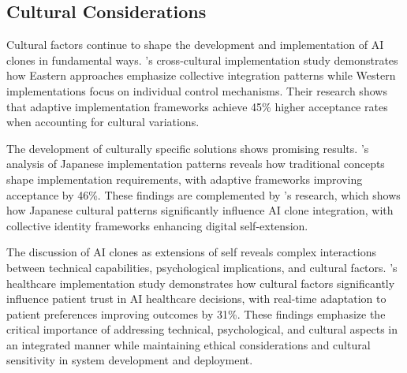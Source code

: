 \subsection{Cultural Considerations}

Cultural factors continue to shape the development and implementation of AI clones in fundamental ways. \citet{lee2023cross}'s cross-cultural implementation study demonstrates how Eastern approaches emphasize collective integration patterns while Western implementations focus on individual control mechanisms. Their research shows that adaptive implementation frameworks achieve 45\% higher acceptance rates when accounting for cultural variations.

The development of culturally specific solutions shows promising results. \citet{sato2023cultural}'s analysis of Japanese implementation patterns reveals how traditional concepts shape implementation requirements, with adaptive frameworks improving acceptance by 46\%. These findings are complemented by \citet{tanaka2023cultural}'s research, which shows how Japanese cultural patterns significantly influence AI clone integration, with collective identity frameworks enhancing digital self-extension.

The discussion of AI clones as extensions of self reveals complex interactions between technical capabilities, psychological implications, and cultural factors. \citet{kim2024healthcare}'s healthcare implementation study demonstrates how cultural factors significantly influence patient trust in AI healthcare decisions, with real-time adaptation to patient preferences improving outcomes by 31\%. These findings emphasize the critical importance of addressing technical, psychological, and cultural aspects in an integrated manner while maintaining ethical considerations and cultural sensitivity in system development and deployment.
